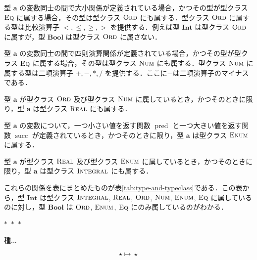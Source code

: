 \documentclass[a4paper,twocolumn]{jsbook}
\newcommand{\separator}{\begin{center}$*$~$*$~$*$\end{center}}
\newcommand{\mSpecialFunc}[1]{\mathrm{#1}}
\DeclareMathOperator{\mPred}{\mSpecialFunc{pred}}
\DeclareMathOperator{\mSucc}{\mSpecialFunc{succ}}
\DeclareMathOperator{\mMapsTo}{\mapsto}
\newcommand{\mType}[1]{\mathbf{#1}}
\newcommand{\mBoolType}{\mType{Bool}}
\newcommand{\mIntType}{\mType{Int}}
\newcommand{\mGenericTypeClass}[1]{\textsc{#1}} %
\newcommand{\mEnumTypeClass}{\mGenericTypeClass{Enum}}
\newcommand{\mEqTypeClass}{\mGenericTypeClass{Eq}}
\newcommand{\mIntegralTypeClass}{\mGenericTypeClass{Integral}}
\newcommand{\mNumTypeClass}{\mGenericTypeClass{Num}}
\newcommand{\mOrdTypeClass}{\mGenericTypeClass{Ord}}
\newcommand{\mRealTypeClass}{\mGenericTypeClass{Real}}
\newcommand{\mProj}[2]{#1\mMapsTo#2}
\begin{document}
型 $\mType{a}$ の変数同士の間で大小関係が定義されている場合，かつその型が型クラス $\mEqTypeClass$ に属する場合，その型は型クラス $\mOrdTypeClass$ にも属する．型クラス $\mOrdTypeClass$ に属する型は比較演算子 $<,\le,\ge,>$ を提供する．例えば型 $\mIntType$ は型クラス $\mOrdTypeClass$ に属すが，型 $\mBoolType$ は型クラス $\mOrdTypeClass$ に属さない．

型 $\mType{a}$ の変数同士の間で四則演算関係が定義されている場合，かつその型が型クラス $\mEqTypeClass$ に属する場合，その型は型クラス $\mNumTypeClass$ にも属する．型クラス $\mNumTypeClass$ に属する型は二項演算子 $+,-,*,/$ を提供する．ここに$-$は二項演算子のマイナスである．

型 $\mType{a}$ が型クラス $\mOrdTypeClass$ 及び型クラス $\mNumTypeClass$ に属しているとき，かつそのときに限り，型 $\mType{a}$ は型クラス $\mRealTypeClass$ にも属する．

型 $\mType{a}$ の変数について，一つ小さい値を返す関数 $\mPred$ と一つ大きい値を返す関数 $\mSucc$ が定義されているとき，かつそのときに限り，型 $\mType{a}$ は型クラス $\mEnumTypeClass$ に属する．

型 $\mType{a}$ が型クラス $\mRealTypeClass$ 及び型クラス $\mEnumTypeClass$ に属しているとき，かつそのときに限り，型 $\mType{a}$ は型クラス $\mIntegralTypeClass$ にも属する．

これらの関係を表にまとめたものが表\ref{tab:type-and-typeclass}である．この表から，型 $\mIntType$ は型クラス $\mIntegralTypeClass$, $\mRealTypeClass$, $\mOrdTypeClass$, $\mNumTypeClass$, $\mEnumTypeClass$, $\mEqTypeClass$ に属しているのに対し，型 $\mBoolType$ は $\mOrdTypeClass$, $\mEnumTypeClass$, $\mEqTypeClass$ にのみ属しているのがわかる．

\separator


種...

\begin{equation*}
\mProj{\star}{\star}
\end{equation*}
\end{document}
